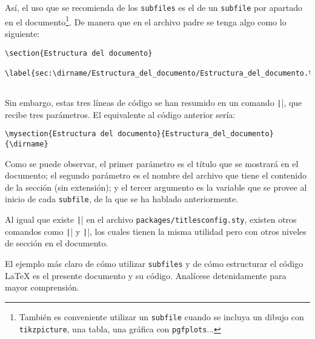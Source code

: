 \documentclass[../../main.tex]{subfile}
\begin{document}
  Así, el uso que se recomienda de los \texttt{subfiles} es el de un \texttt{subfile} por apartado en el documento\footnote{También es conveniente utilizar un \texttt{subfile} cuando se incluya un dibujo con \texttt{tikzpicture}, una tabla, una gráfica con \texttt{pgfplots}...}. De manera que en el archivo padre se tenga algo como lo siguiente:

  \begin{verbatim}
\section{Estructura del documento}
  \label{sec:\dirname/Estructura_del_documento/Estructura_del_documento.tex}
  
  \end{verbatim}

  Sin embargo, estas tres líneas de código se han resumido en un comando \texttt|\mysection|, que recibe tres parámetros. El equivalente al código anterior sería:

  \begin{verbatim}
\mysection{Estructura del documento}{Estructura_del_documento}{\dirname}
  \end{verbatim}

  Como se puede observar, el primer parámetro es el título que se mostrará en el documento; el segundo parámetro es el nombre del archivo que tiene el contenido de la sección (sin extensión); y el tercer argumento es la variable que se provee al inicio de cada \texttt{subfile}, de la que se ha hablado anteriormente.

  Al igual que existe \texttt|\mysection| en el archivo \texttt{packages/titlesconfig.sty}, existen otros comandos como \texttt|\mysubsection| y \texttt|\mysubsubsection|, los cuales tienen la misma utilidad pero con otros niveles de sección en el documento.

  El ejemplo más claro de cómo utilizar \texttt{subfiles} y de cómo estructurar el código LaTeX es el presente documento y su código. Analícese detenidamente para mayor comprensión.
\end{document}
